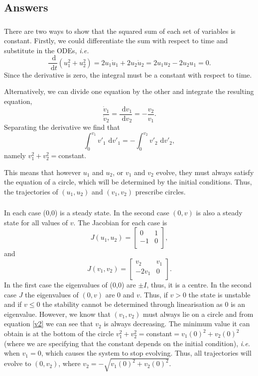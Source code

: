 \documentclass[]{article}
\newcommand{\bb}{\begin{equation}}
\newcommand{\ee}{\end{equation}}
\newcommand{\rd}{\text{ d}}
\newcommand{\eqn}[1]{equation \eqref{#1}}
\newcommand{\ie}{\emph{i.e.} }
\begin{document}
\begin{Answ}
\subsection{Answers}
\subsubsection{}
There are two ways to show that the squared sum of each set of variables is constant. Firstly, we could differentiate the sum with respect to time and substitute in the ODEs, \ie
\bb
\frac{\rd}{\rd t}(u_1^2+u_2^2)=2u_1\dot{u}_1+2u_2\dot{u}_2=2u_1u_2-2u_2u_1=0.
\ee
Since the derivative is zero, the integral must be a constant with respect to time.

Alternatively, we can divide one equation by the other and integrate the resulting equation,
\bb
\frac{\dot{v}_1}{\dot{v}_2}=\frac{\rd v_1}{\rd v_2}=-\frac{v_2}{v_1}.
\ee
Separating the derivative we find that
\bb
\int^{v_1}_0 v'_1\rd v'_1=-\int^{v_2}_0 v'_2\rd v'_2,
\ee
namely $v^2_1+v^2_2=$constant.

This means that however $u_1$ and $u_2$, or $v_1$ and $v_2$ evolve, they must always satisfy the equation of a circle, which will be determined by the initial conditions. Thus,  the trajectories of $(u_1,u_2)$ and $(v_1,v_2)$  prescribe circles.

\subsubsection{}
In each case (0,0) is a steady state. In the second case $(0,v)$ is also a steady state for all values of $v$. The Jacobian for each case is
\bb
J(u_1,u_2)=\left[ {\begin{array}{cc}
   0&1 \\
  -1 & 0 \\
  \end{array} } \right],
\ee
and
\bb
J(v_1,v_2)=\left[ {\begin{array}{cc}
  v_2&v_1 \\
  -2v_1 & 0 \\
  \end{array} } \right].
\ee
In the first case the eigenvalues of (0,0) are $\pm I$, thus, it is a centre. In the second case $J$ the eigenvalues of $(0,v)$ are 0 and $v$. Thus, if $v>0$ the state is unstable and if $v\leq0$ the stability cannot be determined through linearisation as 0 is an eigenvalue. However, we know that $(v_1,v_2)$ must always lie on a circle and from \eqn{v2} we can see that $v_2$ is always decreasing. The minimum value it can obtain is at the bottom of the circle $v_1^2+v_2^2=$constant$=v_1(0)^2+v_2(0)^2$ (where we are specifying that the constant depends on the initial condition), \ie when $v_1=0$, which causes the system to stop evolving. Thus, all trajectories will evolve to $(0,v_2)$, where $v_2=-\sqrt{v_1(0)^2+v_2(0)^2}$.
\end{Answ}
\end{document}
